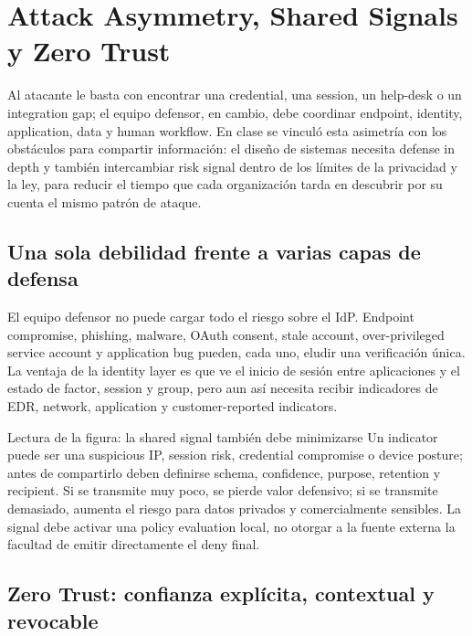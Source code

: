 \section{Attack Asymmetry, Shared Signals y Zero Trust}

Al atacante le basta con encontrar una credential, una session, un help-desk o un integration gap; el equipo defensor, en cambio, debe coordinar endpoint, identity, application, data y human workflow. En clase se vinculó esta asimetría con los obstáculos para compartir información: el diseño de sistemas necesita defense in depth y también intercambiar risk signal dentro de los límites de la privacidad y la ley, para reducir el tiempo que cada organización tarda en descubrir por su cuenta el mismo patrón de ataque.

\subsection{Una sola debilidad frente a varias capas de defensa}

El equipo defensor no puede cargar todo el riesgo sobre el IdP. Endpoint compromise, phishing, malware, OAuth consent, stale account, over-privileged service account y application bug pueden, cada uno, eludir una verificación única. La ventaja de la identity layer es que ve el inicio de sesión entre aplicaciones y el estado de factor, session y group, pero aun así necesita recibir indicadores de EDR, network, application y customer-reported indicators.


\begin{knowledgebox}{Lectura de la figura: la shared signal también debe minimizarse}
Un indicator puede ser una suspicious IP, session risk, credential compromise o device posture; antes de compartirlo deben definirse schema, confidence, purpose, retention y recipient. Si se transmite muy poco, se pierde valor defensivo; si se transmite demasiado, aumenta el riesgo para datos privados y comercialmente sensibles. La signal debe activar una policy evaluation local, no otorgar a la fuente externa la facultad de emitir directamente el deny final.
\end{knowledgebox}

\subsection{Zero Trust: confianza explícita, contextual y revocable}

